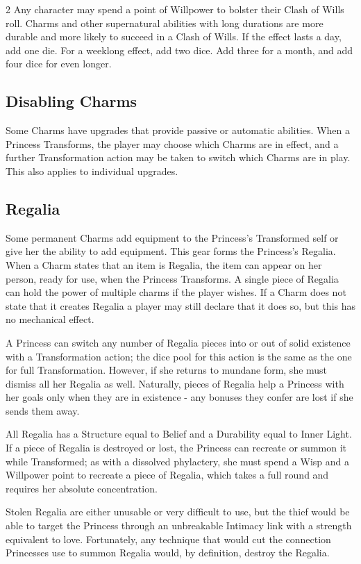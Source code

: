 \begin{multicols}{2}
Any character may spend a point of Willpower to bolster their Clash of Wills roll. Charms and other supernatural abilities with long durations are more durable and more likely to succeed in a Clash of Wills. If the effect lasts a day, add one die. For a weeklong effect, add two dice. Add three for a month, and add four dice for even longer. 

\subsection*{Disabling Charms}

Some Charms have upgrades that provide passive or automatic abilities. When a Princess Transforms, the player may choose which Charms are in effect, and a further Transformation action may be taken to switch which Charms are in play. This also applies to individual upgrades. 

\subsection*{Regalia}

Some permanent Charms add equipment to the Princess's Transformed self or give her the ability to add equipment. This gear forms the Princess's Regalia. When a Charm states that an item is Regalia, the item can appear on her person, ready for use, when the Princess Transforms. A single piece of Regalia can hold the power of multiple charms if the player wishes. If a Charm does not state that it creates Regalia a player may still declare that it does so, but this has no mechanical effect. 

A Princess can switch any number of Regalia pieces into or out of solid existence with a Transformation action; the dice pool for this action is the same as the one for full Transformation. However, if she returns to mundane form, she must dismiss all her Regalia as well. Naturally, pieces of Regalia help a Princess with her goals only when they are in existence - any bonuses they confer are lost if she sends them away.

All Regalia has a Structure equal to Belief and a Durability equal to Inner Light. If a piece of Regalia is destroyed or lost, the Princess can recreate or summon it while Transformed; as with a dissolved phylactery, she must spend a Wisp and a Willpower point to recreate a piece of Regalia, which takes a full round and requires her absolute concentration. 

Stolen Regalia are either unusable or very difficult to use, but the thief would be able to target the Princess through an unbreakable Intimacy link with a strength equivalent to love. Fortunately, any technique that would cut the connection Princesses use to summon Regalia would, by definition, destroy the Regalia.  



\end{multicols}
